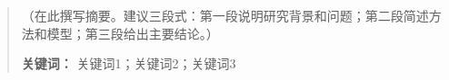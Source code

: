 \begin{abstract}

（在此撰写摘要。建议三段式：第一段说明研究背景和问题；第二段简述方法和模型；第三段给出主要结论。）

\vspace{1em}
\noindent\textbf{关键词：} 关键词1；关键词2；关键词3
\end{abstract}
